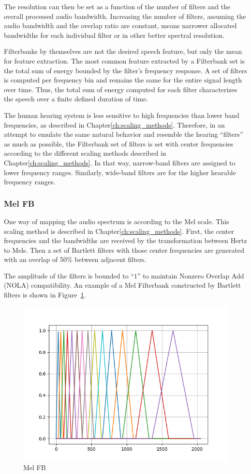 The resolution can then be set as a function of
the number of filters and the overall processed audio bandwidth.
Increasing the number of filters, assuming the 
audio bandwidth and the overlap ratio are constant, means
narrower allocated bandwidths for each individual filter
or in other better spectral resolution.

Filterbanks by themselves are not the desired speech feature,
but only the mean for feature extraction. 
The most common feature extracted by a Filterbank set
is the total sum of energy bounded by the filter's frequency response.
A set of filters is computed per 
frequency bin and remains the same for 
the entire signal length over time.
Thus, the total sum of energy computed for 
each filter characterizes the 
speech over a finite defined duration of time.

The human hearing system is less sensitive to high frequencies
than lower band frequencies, as described in Chapter\;\ref{ch:scaling_methods}.
Therefore, in an attempt to emulate the same natural behavior and
resemble the hearing ``filters'' as much as possible, 
the Filterbank set of filters is set with center frequencies
according to the different scaling 
methods described in Chapter\;\ref{ch:scaling_methods}.
In that way, narrow-band filters are assigned to 
lower frequency ranges. 
Similarly, wide-band filters are for 
the higher hearable frequency ranges.

\subsubsection{Mel FB}
One way of mapping the audio spectrum is according to the Mel
scale. This scaling method is described in Chapter\;\ref{ch:scaling_methods}.
First, the center frequencies and the bandwidths are received by the transformation
between Hertz to Mels. Then a set of Bartlett
filters with those center frequencies are generated
with an overlap of 50\% between adjacent filters. 


The amplitude of the filters is bounded to ``\(1\)''
to maintain Nonzero Overlap Add (NOLA) compatibility.
An example of a Mel Filterbank constructed by Bartlett filters
is shown in Figure~\ref{fig:sb_mel_fb}.
\begin{figure}[H]
    \centering
    \includegraphics[width=0.75\linewidth]{Features/images/sb_mel_fb}
    \caption{Mel FB}\label{fig:sb_mel_fb}
\end{figure}

